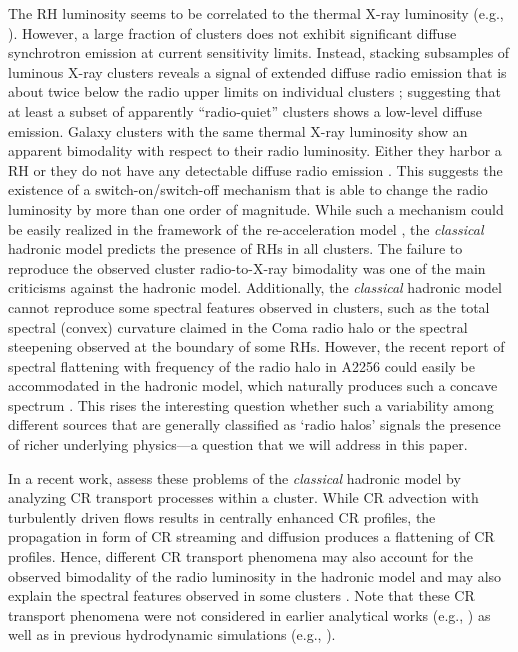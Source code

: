 \documentclass[useAMS,usenatbib]{mn2e}
\begin{document}
The RH luminosity seems to be correlated to the thermal X-ray luminosity (e.g.,
\citealp{2009A&A...507..661B,2011A&A...527A..99E}).  However, a large fraction
of clusters does not exhibit significant diffuse synchrotron emission at current
sensitivity limits. Instead, stacking subsamples of luminous X-ray clusters
reveals a signal of extended diffuse radio emission that is about twice below
the radio upper limits on individual clusters \citep{2011ApJ...740L..28B};
suggesting that at least a subset of apparently ``radio-quiet'' clusters shows a
low-level diffuse emission. Galaxy clusters with the same thermal X-ray
luminosity show an apparent bimodality with respect to their radio
luminosity. Either they harbor a RH or they do not have any detectable diffuse
radio emission \citep{2009A&A...507..661B,2011A&A...527A..99E}. This suggests
the existence of a switch-on/switch-off mechanism that is able to change the
radio luminosity by more than one order of magnitude.  While such a mechanism
could be easily realized in the framework of the re-acceleration model
\citep{2009A&A...507..661B}, the \emph{classical} hadronic model predicts the
presence of RHs in all clusters. The failure to reproduce the observed cluster
radio-to-X-ray bimodality was one of the main criticisms against the hadronic
model.  Additionally, the \emph{classical} hadronic model cannot reproduce some
spectral features observed in clusters, such as the total spectral (convex)
curvature claimed in the Coma radio halo or the spectral steepening observed at
the boundary of some RHs. However, the recent report of spectral flattening with
frequency of the radio halo in A2256 \citep{2012A&A...543A..43V} could easily be
accommodated in the hadronic model, which naturally produces such a concave
spectrum \citep{2010MNRAS.409..449P}. This rises the interesting question
whether such a variability among different sources that are generally classified
as `radio halos' signals the presence of richer underlying physics---a question
that we will address in this paper.

In a recent work, \cite{2011A&A...527A..99E} assess these problems of the
\emph{classical} hadronic model by analyzing CR transport processes within a
cluster. While CR advection with turbulently driven flows results in centrally
enhanced CR profiles, the propagation in form of CR streaming and diffusion
produces a flattening of CR profiles. Hence, different CR transport phenomena
may also account for the observed bimodality of the radio luminosity in the
hadronic model and may also explain the spectral features observed in some
clusters \citep{2011A&A...527A..99E}. Note that these CR transport phenomena
were not considered in earlier analytical works (e.g.,
\citealp{2004A&A...413...17P}) as well as in previous hydrodynamic simulations
(e.g., \citealp{2001ApJ...562..233M, 2008MNRAS.385.1211P,
  2010MNRAS.409..449P}).
\end{document}
